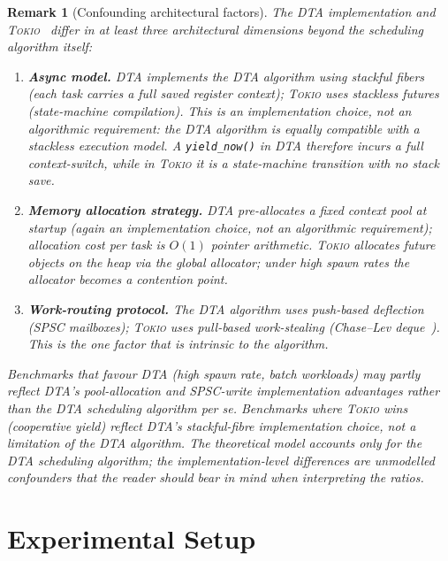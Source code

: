 \documentclass[11pt,a4paper]{article}
\newtheorem{remark}{Remark}[section]
\newcommand{\dtact}{\textsc{DTA}}
\newcommand{\tokio}{\textsc{Tokio}}
\begin{document}
\begin{remark}[Confounding architectural factors]
\label{rem:confounders}
The \dtact{} implementation and \tokio{}~\cite{tokio} differ in at least three architectural dimensions
beyond the scheduling algorithm itself:
\begin{enumerate}
  \item \textbf{Async model.}
        \dtact{} implements the DTA algorithm using \emph{stackful} fibers
        (each task carries a full saved register context); \tokio{} uses
        \emph{stackless} futures (state-machine compilation).  This is an
        \emph{implementation choice}, not an algorithmic requirement:
        the DTA algorithm is equally compatible with a stackless execution model.
        A \texttt{yield\_now()} in \dtact{} therefore incurs a full
        context-switch, while in \tokio{} it is a state-machine transition
        with no stack save.
  \item \textbf{Memory allocation strategy.}
        \dtact{} pre-allocates a fixed context pool at startup
        (again an implementation choice, not an algorithmic requirement);
        allocation cost per task is $O(1)$ pointer arithmetic.
        \tokio{} allocates future objects on the heap via the global
        allocator; under high spawn rates the allocator becomes
        a contention point.
  \item \textbf{Work-routing protocol.}
        The DTA algorithm uses push-based deflection (SPSC mailboxes);
        \tokio{} uses pull-based work-stealing (Chase--Lev deque~\cite{chase_lev2005}).
        This is the one factor that is intrinsic to the algorithm.
\end{enumerate}
Benchmarks that favour \dtact{} (high spawn rate, batch workloads) may
partly reflect \dtact{}'s pool-allocation and SPSC-write implementation
advantages rather than the DTA scheduling algorithm per se.
Benchmarks where \tokio{} wins (cooperative yield) reflect
\dtact{}'s stackful-fibre implementation choice, not a limitation
of the DTA algorithm.
The theoretical model accounts only for the DTA scheduling algorithm;
the implementation-level differences are unmodelled confounders
that the reader should bear in mind when interpreting the ratios.
\end{remark}

\section{Experimental Setup}
\end{document}
